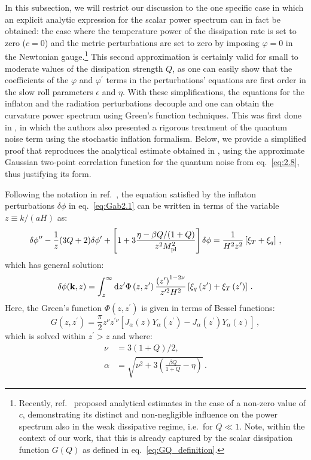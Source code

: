 \documentclass[a4paper,11pt]{article}
\begin{document}
In this subsection, we will restrict our discussion to the one specific case in which  an explicit analytic expression for the scalar power spectrum can in fact be obtained: the case where  the temperature power of the dissipation rate is set to zero ($c=0$) and  the metric perturbations are set to zero by imposing $\varphi=0$ in the Newtonian gauge.\footnote{Recently, ref.~\cite{Ballesteros:2023dno} proposed analytical estimates in the case of a non-zero value of $c$, demonstrating its distinct and non-negligible influence on the power spectrum also in the weak dissipative regime, i.e.\ for $Q\ll 1$. Note, within the context of our work, that this is already captured by the scalar dissipation function $G(Q)$ as defined in eq.~\eqref{eq:GQ_definition}.} This second approximation is certainly valid for small to moderate values of the dissipation strength $Q$, as one can easily show that the coefficients of the $\varphi$ and $\varphi^\prime$ terms in the perturbations' equations are first order in the slow roll parameters $\epsilon$ and $\eta$. With these simplifications, the equations for the inflaton and the radiation perturbations decouple and one can obtain the curvature power spectrum using Green's function techniques. This was first done in \cite{Ramos:2013nsa}, in which the authors also presented a rigorous treatment of the quantum noise term using the stochastic inflation formalism. Below, we provide a simplified proof that reproduces the analytical estimate obtained in \cite{Ramos:2013nsa}, using the approximate Gaussian two-point correlation function for the quantum noise from eq.~\eqref{eq:2.8}, thus justifying its form.

Following the notation in ref.~\cite{Ramos:2013nsa}, the equation satisfied by the inflaton perturbations $\delta\phi$ in eq.~\eqref{eq:Gab2.1} can be written in terms of the variable $z\equiv k/(aH)$ as:
\begin{equation}
    \delta \phi^{\prime \prime}-\frac{1}{z}(3 Q+2) \delta \phi^{\prime}+\left[1+3 \frac{\eta-\beta Q /(1+Q)}{z^2 M_{\rm{pl}}^2}\right] \delta \phi =\frac{1}{H^2 z^2}\left[\xi_T+\xi_q\right]\,, \label{eq2:Gab5}
\end{equation}
which has general solution:
\begin{equation}
    \delta \phi(\mathbf{k}, z)=\int_z^{\infty} {\rm d} z^{\prime} \Phi\left(z, z^{\prime}\right) \frac{\left(z^{\prime}\right)^{1-2 \nu}}{z^{\prime 2} H^2}\left[\xi_q\left(z^{\prime}\right)+\xi_T\left(z^{\prime}\right)\right]\,. \label{eq:dphi1}
\end{equation}
Here, the Green's function $\Phi(z,z^\prime)$ is given in terms of Bessel functions:
\begin{equation}
    G\left(z, z^{\prime}\right)=\frac{\pi}{2} z^\nu z^{\prime \nu}\left[J_\alpha(z) Y_\alpha\left(z^{\prime}\right)-J_\alpha\left(z^{\prime}\right) Y_\alpha(z)\right]\,,
\end{equation}
which is solved within $z^\prime > z$ and where:
\begin{align}
    \nu & =3(1+Q) / 2, \label{eq:nu}\\
    \alpha & =\sqrt{\nu^2+3\left(\frac{ \beta
Q}{1+Q}- \eta\right)}\,. \label{eq:alpha}
\end{align}
\end{document}

